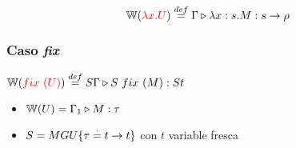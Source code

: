 \documentclass[10pt,a4paper]{article}
\begin{document}
$$\mathbb{W}({\color{red}\lambda x. U}) \overset{def}{=} \Gamma\triangleright \lambda x: s . M : s\to\rho$$

\subsubsection*{Caso \textit{fix}}
$\mathbb{W}({\color{red}fix~(U)}) \overset{def}{=} S\Gamma\triangleright S~fix~(M) : St$
\begin{centrado}
\begin{itemize}
\item $\mathbb{W}(U) = \Gamma_1\triangleright M : \tau$
\item $S = MGU\{\tau\overset{\cdot}{=} t\to t\}$ con $t$ variable fresca
\end{itemize}
\end{centrado}

\newpage
\end{document}
